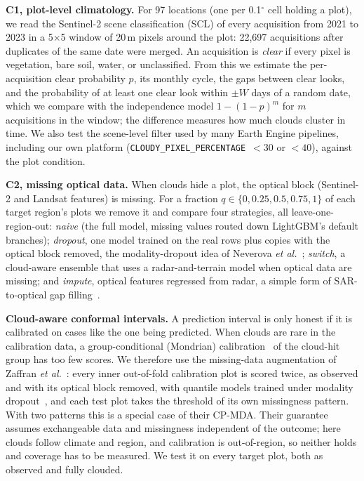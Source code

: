 \documentclass[conference,a4paper]{IEEEtran}
\begin{document}
\textbf{C1, plot-level climatology.} For 97 locations (one per 0.1$^\circ$ cell holding a plot), we read the Sentinel-2 scene classification (SCL) of every acquisition from 2021 to 2023 in a 5$\times$5 window of 20\,m pixels around the plot: 22{,}697 acquisitions after duplicates of the same date were merged. An acquisition is \emph{clear} if every pixel is vegetation, bare soil, water, or unclassified. From this we estimate the per-acquisition clear probability $p$, its monthly cycle, the gaps between clear looks, and the probability of at least one clear look within $\pm W$ days of a random date, which we compare with the independence model $1-(1-p)^m$ for $m$ acquisitions in the window; the difference measures how much clouds cluster in time. We also test the scene-level filter used by many Earth Engine pipelines, including our own platform (\texttt{CLOUDY\_PIXEL\_PERCENTAGE}~$<30$ or $<40$), against the plot condition.

\textbf{C2, missing optical data.} When clouds hide a plot, the optical block (Sentinel-2 and Landsat features) is missing. For a fraction $q\in\{0,0.25,0.5,0.75,1\}$ of each target region's plots we remove it and compare four strategies, all leave-one-region-out: \emph{naive} (the full model, missing values routed down LightGBM's default branches); \emph{dropout}, one model trained on the real rows plus copies with the optical block removed, the modality-dropout idea of Neverova \textit{et al.}~\cite{neverova2016moddrop}; \emph{switch}, a cloud-aware ensemble that uses a radar-and-terrain model when optical data are missing; and \emph{impute}, optical features regressed from radar, a simple form of SAR-to-optical gap filling~\cite{meraner2020cloud}.

\textbf{Cloud-aware conformal intervals.} A prediction interval is only honest if it is calibrated on cases like the one being predicted. When clouds are rare in the calibration data, a group-conditional (Mondrian) calibration~\cite{bostrom2020mondrian} of the cloud-hit group has too few scores. We therefore use the missing-data augmentation of Zaffran \textit{et al.}~\cite{zaffran2023conformal}: every inner out-of-fold calibration plot is scored twice, as observed and with its optical block removed, with quantile models trained under modality dropout~\cite{neverova2016moddrop}, and each test plot takes the threshold of its own missingness pattern. With two patterns this is a special case of their CP-MDA. Their guarantee assumes exchangeable data and missingness independent of the outcome; here clouds follow climate and region, and calibration is out-of-region, so neither holds and coverage has to be measured. We test it on every target plot, both as observed and fully clouded.
\end{document}

